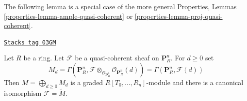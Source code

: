 The following lemma is a special case of the more general
Properties, Lemmas \ref{properties-lemma-ample-quasi-coherent} or
\ref{properties-lemma-proj-quasi-coherent}.

\begin{lemma}
\label{constructions-lemma-quasi-coherent-projective-space}
\href{https://stacks.math.columbia.edu/tag/03GM}{\texttt{Stacks tag 03GM}}

Let $R$ be a ring.
Let $\mathcal{F}$ be a quasi-coherent sheaf on $\mathbf{P}^n_R$.
For $d \geq 0$ set
$$
M_d
=
\Gamma(\mathbf{P}^n_R,
\mathcal{F} \otimes_{\mathcal{O}_{\mathbf{P}^n_R}}
\mathcal{O}_{\mathbf{P}^n_R}(d))
=
\Gamma(\mathbf{P}^n_R, \mathcal{F}(d))
$$
Then $M = \bigoplus_{d \geq 0} M_d$ is a graded $R[T_0, \ldots, R_n]$-module
and there is a canonical isomorphism $\mathcal{F} = \widetilde{M}$.
\end{lemma}

